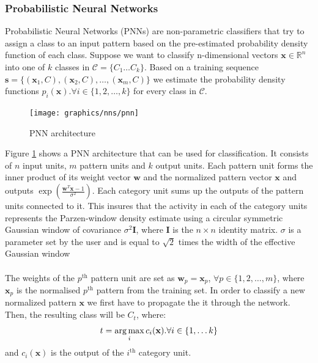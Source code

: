 	\subsubsection{Probabilistic Neural Networks}
 	Probabilistic Neural Networks (PNNs) are non-parametric classifiers that try to assign a class to an input pattern based on the pre-estimated probability density function of each class. Suppose we want to classify n-dimensional vectors $\mathbf{x} \in \mathbb{R}^n$ into one of $k$ classes in $\mathcal{C}=\{C_1\dots C_k\}$. Based on a training sequence $\mathbf{s} = \{ (\mathbf{x}_1, C), (\mathbf{x}_2, C), \dots ,(\mathbf{x}_m, C)\}$ we estimate the probability density functions $p_i(\mathbf{x}). \forall i \in \{1,2,\dots,k \}$ for every class in $\mathcal{C}$. 

  	\begin{figure}[H]
 		\centering
 		\texttt{[image: graphics/nns/pnn]}
 		\caption{PNN architecture}
 		\label{Fig 2.8}
 	\end{figure}
	 
	 Figure \ref{Fig 2.8} shows a PNN architecture that can be used for classification. It consists of $n$ input units, $m$ pattern units and $k$ output units. Each pattern unit forms the inner product of its weight vector $\mathbf{w}$ and the normalized pattern vector $\mathbf{x}$ and outputs $\exp(\frac{\mathbf{w}^T\mathbf{x} - 1}{\sigma^2})$. Each category unit sums up the outputs of the pattern units connected to it. This insures that the activity in each of the category units represents the Parzen-window density estimate using a circular symmetric Gaussian window of covariance $\sigma^2\mathbf{I}$, where $\mathbf{I}$ is the $n\times n$ identity matrix. $\sigma$ is a parameter set by the user and is equal to $\sqrt{2}$ times the width of the effective Gaussian window
     \\ \\ 
	 The weights of the $p^\text{th}$ pattern unit are set as $\mathbf{w}_p = \mathbf{x}_p$, $\forall p \in \{ 1,2,\dots ,m \}$, where $\mathbf{x}_p$ is the normalised $p^\text{th}$ pattern from the training set. In order to classify a new normalized pattern $\mathbf{x}$ we first have to propagate the it through the network. Then, the resulting class will be $C_t$, where:
	 \begin{equation}
		 t = \operatorname*{arg\,max}_i c_i(\mathbf{x}). \forall i \in \{1,\dots k\}
	 \end{equation}
	 and $c_i(\mathbf{x})$ is the output of the $i^\text{th}$ category unit.
